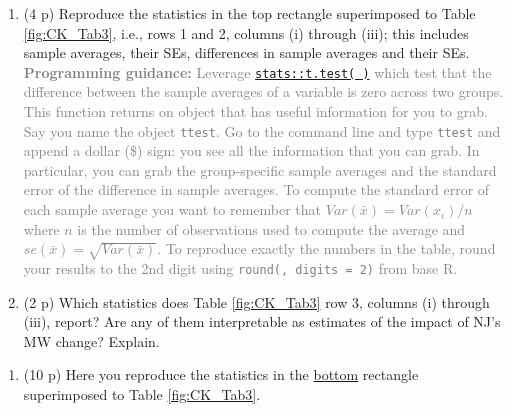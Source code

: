 \documentclass[
]{article}
\providecommand{\tightlist}{%
  \setlength{\itemsep}{0pt}\setlength{\parskip}{0pt}}
\begin{document}
\begin{enumerate}
\def\labelenumi{\alph{enumi}.}
\item
  (4 p) Reproduce the statistics in the top rectangle superimposed to
  Table \ref{fig:CK_Tab3}, i.e., rows 1 and 2, columns (i) through
  (iii); this includes sample averages, their SEs, differences in sample
  averages and their SEs.
  \textcolor{gray}{\textbf{Programming guidance:} Leverage \href{https://www.rdocumentation.org/packages/stats/versions/3.6.2/topics/t.test}{\texttt{stats::t.test( )}} which test that the difference between the sample averages of a variable is zero across two groups. This function returns on object that has useful information for you to grab. Say you name the object \texttt{ttest}. Go to the command line and type \texttt{ttest} and append a dollar (\$) sign: you see all the information that you can grab. In particular, you can grab the group-specific sample averages and the standard error of the difference in sample averages. To compute the standard error of each sample average you want to remember that $Var(\bar{x})=Var(x_i)/n$ where $n$ is the number of observations used to compute the average and $se(\bar{x})=\sqrt{Var(\bar{x})}$. To reproduce exactly the numbers in the table, round your results to the 2nd digit using \texttt{round(, digits = 2)} from base R. }
\item
  (2 p) Which statistics does Table \ref{fig:CK_Tab3} row 3, columns (i)
  through (iii), report? Are any of them interpretable as estimates of
  the impact of NJ's MW change? Explain.
\end{enumerate}

\begin{enumerate}
\def\labelenumi{\arabic{enumi}.}
\setcounter{enumi}{13}
\tightlist
\item
  (10 p) Here you reproduce the statistics in the \underline{bottom}
  rectangle superimposed to Table
  \ref{fig:CK_Tab3}.\label{item:table3-rows-4-5}
\end{enumerate}
\end{document}
